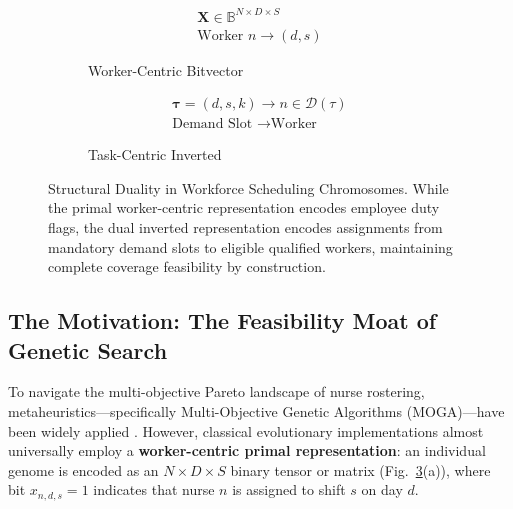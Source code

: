 \documentclass[10pt,journal,compsoc]{IEEEtran}
\begin{document}
\begin{figure}[t]
\centering
\begin{subfigure}[b]{0.48\linewidth}
    \centering
    \vspace{1mm}
    \begin{align*}
    \mathbf{X} \in \mathbb{B}^{N \times D \times S} \\
    \text{Worker } n \longrightarrow (d, s)
    \end{align*}
    \caption{Worker-Centric Bitvector}
    \label{fig:primal_rep}
\end{subfigure}
\hfill
\begin{subfigure}[b]{0.48\linewidth}
    \centering
    \vspace{1mm}
    \begin{align*}
    \mathbf{\tau} = (d, s, k) \longrightarrow n \in \mathcal{D}(\tau) \\
    \text{Demand Slot } \longrightarrow \text{Worker}
    \end{align*}
    \caption{Task-Centric Inverted}
    \label{fig:dual_rep}
\end{subfigure}
\caption{Structural Duality in Workforce Scheduling Chromosomes. While the primal worker-centric representation encodes employee duty flags, the dual inverted representation encodes assignments from mandatory demand slots to eligible qualified workers, maintaining complete coverage feasibility by construction.}
\label{fig:chromosome_duality}
\end{figure}

\subsection{The Motivation: The Feasibility Moat of Genetic Search}
To navigate the multi-objective Pareto landscape of nurse rostering, metaheuristics---specifically Multi-Objective Genetic Algorithms (MOGA)---have been widely applied \cite{deb2002fast,aickelin2000genetic,burke2001hybrid}. However, classical evolutionary implementations almost universally employ a \textbf{worker-centric primal representation}: an individual genome is encoded as an $N \times D \times S$ binary tensor or matrix (Fig.~\ref{fig:chromosome_duality}(a)), where bit $x_{n,d,s} = 1$ indicates that nurse $n$ is assigned to shift $s$ on day $d$.
\end{document}
